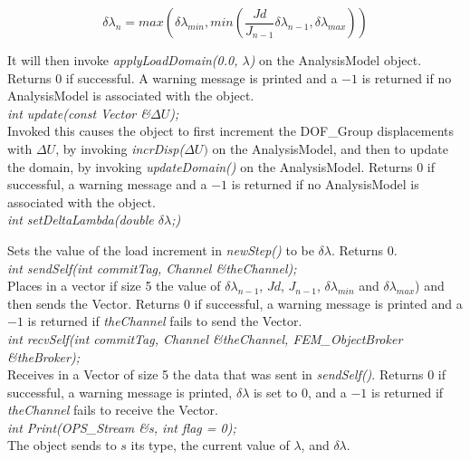 $$ 
\delta \lambda_n = max \left( \delta \lambda_{min}, min \left(
\frac{Jd}{J_{n-1}} \delta \lambda_{n-1}, \delta \lambda_{max} \right) \right)
$$


\noindent It will then invoke
{\em applyLoadDomain(0.0, $\lambda$)} on the AnalysisModel
object. Returns $0$ if successful. A warning message is printed and a
$-1$ is returned if no AnalysisModel is associated with the object. \\

{\em int update(const Vector \&$\Delta U$);} \\
Invoked this causes the object to first increment the DOF\_Group
displacements with $\Delta U$, by invoking {\em incrDisp($\Delta U)$}
on the AnalysisModel, and then to update the domain, by invoking {\em
updateDomain()} on the AnalysisModel. Returns $0$ if successful, a
warning message and a $-1$ is returned if no AnalysisModel is
associated with the object. \\


{\em int setDeltaLambda(double $\delta \lambda$;)} 

Sets the value of the load increment in {\em newStep()} to be $\delta
\lambda$. Returns $0$.\\

{\em int sendSelf(int commitTag, Channel \&theChannel); } \\ 
Places in a vector if size 5 the value of $\delta \lambda_{n-1}$,
$Jd$, $J_{n-1}$, $\delta \lambda_{min}$ and $\delta \lambda_{max}$)
and then sends the Vector. Returns $0$ if successful, a warning
message is printed and a $-1$ is returned if {\em theChannel} fails to
send the Vector. \\ 

{\em int recvSelf(int commitTag, Channel \&theChannel, 
FEM\_ObjectBroker \&theBroker); } \\ 
Receives in a Vector of size 5 the data that was sent in {\em sendSelf()}.
Returns $0$ if successful, a warning message is printed, $\delta
\lambda$ is set to $0$, and a $-1$ is returned if {\em theChannel} 
fails to receive the Vector.\\

{\em int Print(OPS_Stream \&s, int flag = 0);}\\
The object sends to $s$ its type, the current value of $\lambda$, and
$\delta \lambda$. 